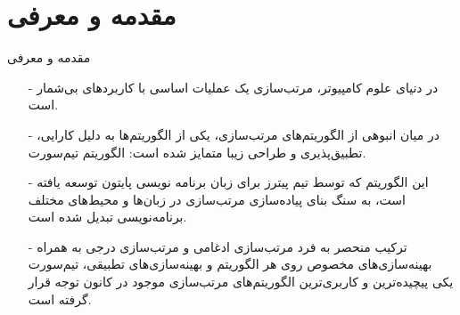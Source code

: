 \section{مقدمه و معرفی}
\begin{frame}{مقدمه و معرفی}
\begin{itemize}\itemr
\item[-]
در دنیای علوم کامپیوتر، مرتب‌سازی یک عملیات اساسی با کاربرد‌های بی‌شمار است.

\item[-]
در میان انبوهی از الگوریتم‌های مرتب‌سازی، یکی از الگوریتم‌ها به دلیل کارایی، تطبیق‌پذیری و طراحی زیبا متمایز شده است: الگوریتم تیم‌سورت.

\item[-]
این الگوریتم که توسط تیم پیترز برای زبان برنامه نویسی پایتون توسعه یافته است، به سنگ بنای پیاده‌سازی مرتب‌سازی در زبان‌ها و محیط‌های مختلف برنامه‌نویسی تبدیل شده است.

\item[-]
ترکیب منحصر به فرد مرتب‌سازی ادغامی و مرتب‌سازی درجی به همراه‌ بهینه‌سازی‌های مخصوص روی هر الگوریتم و بهینه‌سازی‌های تطبیقی‌، تیم‌سورت یکی پیچیده‌ترین و کاربری‌ترین الگوریتم‌های مرتب‌سازی موجود در کانون توجه قرار گرفته است.

\end{itemize}
\end{frame}
